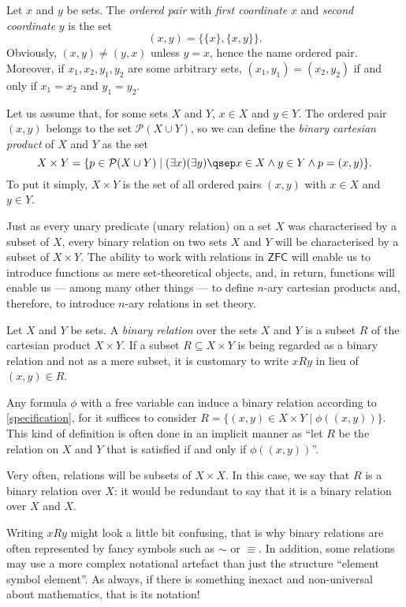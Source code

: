 \begin{definition}
Let $x$ and $y$ be sets. The \emph{ordered pair} with \emph{first coordinate} $x$ and \emph{second coordinate} $y$ is the set
\[ (x,y) = \{ \{x\}, \{x,y\} \}.\]
Obviously, $(x,y) \neq (y,x)$ unless $y = x$, hence the name ordered pair.
Moreover, if $x_1,x_2,y_1,y_2$ are some arbitrary sets, $(x_1,y_1) = (x_2,y_2)$ if and only if $x_1 = x_2$ and $y_1 = y_2$.

Let us assume that, for some sets $X$ and $Y$, $x\in X$ and $y\in Y$. The ordered pair $(x,y)$ belongs to the set $\mathcal{P}(X\cup Y)$, so we can define the \emph{binary cartesian product} of $X$ and $Y$ as the set
\[ X\times Y = \{p \in \mathcal{P}(X\cup Y) \mid (\exists x)(\exists y)\qsep x\in X \land y\in Y \land p = (x,y)\}.\]
To put it simply, $X\times Y$ is the set of all ordered pairs $(x,y)$ with $x\in X$ and $y\in Y$.
\label{<+label+>}
\end{definition}

\begin{para}
Just as every unary predicate (unary relation) on a set $X$ was characterised by a subset of $X$, every binary relation on two sets $X$ and $Y$ will be characterised by a subset of $X\times Y$.
The ability to work with relations in $\mathsf{ZFC}$ will enable us to introduce functions as mere set-theoretical objects, and, in return, functions will enable us --- among many other things --- to define $n$-ary cartesian products and, therefore, to introduce $n$-ary relations in set theory.
\end{para}

\begin{definition}
\label{binrel}
Let $X$ and $Y$ be sets. A \emph{binary relation} over the sets $X$ and $Y$ is a subset $R$ of the cartesian product $X\times Y$.
If a subset $R\subseteq X\times Y$ is being regarded as a binary relation and not as a mere subset, it is customary to write $xRy$ in lieu of $(x,y) \in R$.

Any formula $\phi$ with a free variable can induce a binary relation according to \ref{specification}, for it suffices to consider $R = \{(x,y)\in X\times Y \mid \phi ( ( x,y) )\}$.
This kind of definition is often done in an implicit manner as ``let $R$ be the relation on $X$ and $Y$ that is satisfied if and only if $\phi( (x,y))$''.

Very often, relations will be subsets of $X\times X$. In this case, we say that $R$ is a binary relation over $X$: it would be redundant to say that it is a binary relation over $X$ and $X$.

Writing $xRy$ might look a little bit confusing, that is why binary relations are often represented by fancy symbols such as $\sim$ or $\equiv$.
In addition, some relations may use a more complex notational artefact than just the structure ``element symbol element''.
As always, if there is something inexact and non-universal about mathematics, that is its notation! 


\label{<+label+>}
\end{definition}

